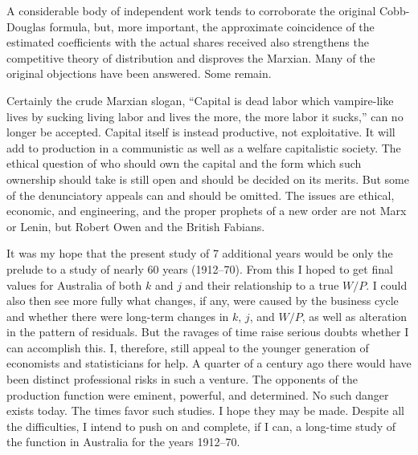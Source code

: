 \documentclass{article}
\begin{document}
A considerable body of independent work tends to corroborate the original Cobb-Douglas formula, but, more important, the approximate coincidence of the estimated coefficients with the actual shares received also strengthens the competitive theory of distribution and disproves the Marxian. Many of the original objections have been answered. Some remain.

Certainly the crude Marxian slogan, ``Capital is dead labor which vampire-like lives by sucking living labor and lives the more, the more labor it sucks,'' can no longer be accepted. Capital itself is instead productive, not exploitative. It will add to production in a communistic as well as a welfare capitalistic society. The ethical question of who should own the capital and the form which such ownership should take is still open and should be decided on its merits. But some of the denunciatory appeals can and should be omitted. The issues are ethical, economic, and engineering, and the proper prophets of a new order are not Marx or Lenin, but Robert Owen and the British Fabians.

It was my hope that the present study of 7 additional years would be only the prelude to a study of nearly 60 years (1912--70). From this I hoped to get final values for Australia of both \(k\) and \(j\) and their relationship to a true \(W/P\). I could also then see more fully what changes, if any, were caused by the business cycle and whether there were long-term changes in \(k\), \(j\), and \(W/P\), as well as alteration in the pattern of residuals. But the ravages of time raise serious doubts whether I can accomplish this. I, therefore, still appeal to the younger generation of economists and statisticians for help. A quarter of a century ago there would have been distinct professional risks in such a venture. The opponents of the production function were eminent, powerful, and determined. No such danger exists today. The times favor such studies. I hope they may be made. Despite all the difficulties, I intend to push on and complete, if I can, a long-time study of the function in Australia for the years 1912--70. 

\end{document}
